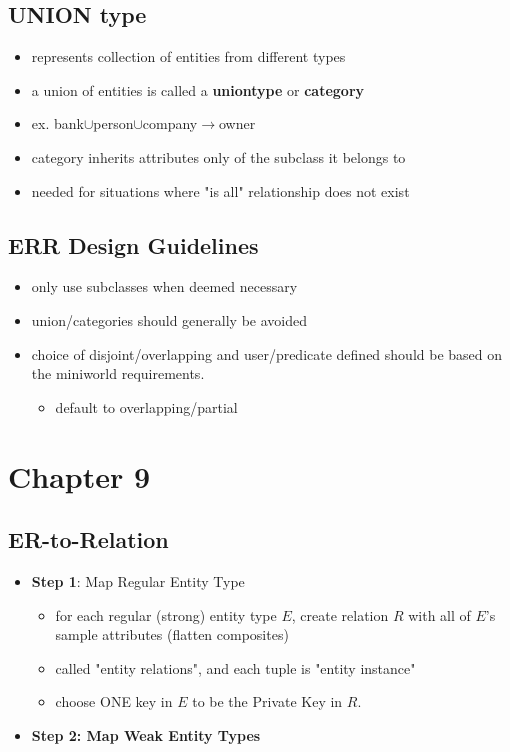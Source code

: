 \documentclass[12pt]{report}
\begin{document}
	\section{UNION type}
	\begin{itemize}
		\item represents collection of entities from different types
		\item a union of entities is called a \textbf{uniontype} or \textbf{category}
		\item ex. bank$\cup$person$\cup$company$\rightarrow$owner
		\item category inherits attributes only of the subclass it belongs to
		\item needed for situations where "is all" relationship does not exist
	\end{itemize}
	\section{ERR Design Guidelines}
	\begin{itemize}
		\item only use subclasses when deemed necessary
		\item union/categories should generally be avoided
		\item choice of disjoint/overlapping and user/predicate defined should be based on the miniworld requirements.
		\begin{itemize}
			\item default to overlapping/partial
		\end{itemize}
	\end{itemize}
	
	\chapter{Chapter 9}
	\section{ER-to-Relation}
	\begin{itemize}
		\item \textbf{Step 1}: Map Regular Entity Type
		\begin{itemize}
			\item for each regular (strong) entity type $E$, create relation $R$ with all of $E$'s sample attributes (flatten composites)
			\item called "entity relations", and each tuple is "entity instance"
			\item choose ONE key in $E$ to be the Private Key in $R$.
		\end{itemize}
		\item \textbf{Step 2: Map Weak Entity Types}
		
	\end{itemize}
	
	
	
	
\end{document}

